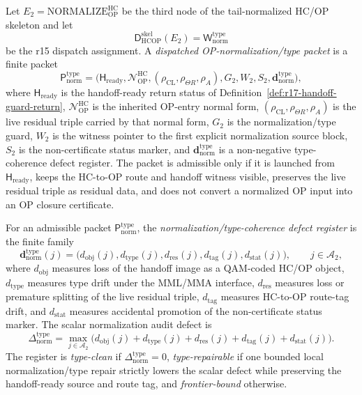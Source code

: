 \begin{definition}
\label{def:dispatched-op-normalization-type-packet}
Let \(E_2=\mathrm{NORMALIZE}_{\mathrm{OP}}^{\mathrm{HC}}\) be the third node of the tail-normalized HC/OP skeleton and let
\[
  \mathsf D_{\mathrm{HCOP}}^{\mathrm{skel}}(E_2)
  =
  \mathsf W_{\mathrm{norm}}^{\mathrm{type}}
\]
be the r15 dispatch assignment.  A \emph{dispatched OP-normalization/type packet} is a finite packet
\[
  \mathsf P_{\mathrm{norm}}^{\mathrm{type}}
  =
  \bigl(\mathsf H_{\mathrm{ready}},\mathcal N_{\mathrm{OP}}^{\mathrm{HC}},
        (\rho_{\mathrm{CL}},\rho_{\Theta R},\rho_A),G_2,W_2,S_2,
        \mathbf d_{\mathrm{norm}}^{\mathrm{type}}\bigr),
\]
where \(\mathsf H_{\mathrm{ready}}\) is the handoff-ready return status of Definition~\ref{def:r17-handoff-guard-return}, \(\mathcal N_{\mathrm{OP}}^{\mathrm{HC}}\) is the inherited OP-entry normal form, \((\rho_{\mathrm{CL}},\rho_{\Theta R},\rho_A)\) is the live residual triple carried by that normal form, \(G_2\) is the normalization/type guard, \(W_2\) is the witness pointer to the first explicit normalization source block, \(S_2\) is the non-certificate status marker, and \(\mathbf d_{\mathrm{norm}}^{\mathrm{type}}\) is a non-negative type-coherence defect register.  The packet is admissible only if it is launched from \(\mathsf H_{\mathrm{ready}}\), keeps the HC-to-OP route and handoff witness visible, preserves the live residual triple as residual data, and does not convert a normalized OP input into an OP closure certificate.
\end{definition}

\begin{definition}
\label{def:normalization-type-coherence-defect-register}
For an admissible packet \(\mathsf P_{\mathrm{norm}}^{\mathrm{type}}\), the \emph{normalization/type-coherence defect register} is the finite family
\[
  \mathbf d_{\mathrm{norm}}^{\mathrm{type}}(j)
  =
  \bigl(d_{\mathrm{obj}}(j),d_{\mathrm{type}}(j),d_{\mathrm{res}}(j),d_{\mathrm{tag}}(j),d_{\mathrm{stat}}(j)\bigr),
  \qquad j\in\mathcal A_2,
\]
where \(d_{\mathrm{obj}}\) measures loss of the handoff image as a QAM-coded HC/OP object, \(d_{\mathrm{type}}\) measures type drift under the MML/MMA interface, \(d_{\mathrm{res}}\) measures loss or premature splitting of the live residual triple, \(d_{\mathrm{tag}}\) measures HC-to-OP route-tag drift, and \(d_{\mathrm{stat}}\) measures accidental promotion of the non-certificate status marker.  The scalar normalization audit defect is
\[
  \Delta_{\mathrm{norm}}^{\mathrm{type}}
  =
  \max_{j\in\mathcal A_2}
  \bigl(d_{\mathrm{obj}}(j)+d_{\mathrm{type}}(j)+d_{\mathrm{res}}(j)+d_{\mathrm{tag}}(j)+d_{\mathrm{stat}}(j)\bigr).
\]
The register is \emph{type-clean} if \(\Delta_{\mathrm{norm}}^{\mathrm{type}}=0\), \emph{type-repairable} if one bounded local normalization/type repair strictly lowers the scalar defect while preserving the handoff-ready source and route tag, and \emph{frontier-bound} otherwise.
\end{definition}

